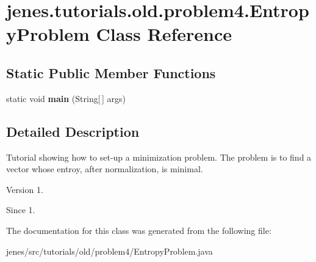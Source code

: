 \hypertarget{classjenes_1_1tutorials_1_1old_1_1problem4_1_1_entropy_problem}{\section{jenes.\-tutorials.\-old.\-problem4.\-Entropy\-Problem Class Reference}
\label{classjenes_1_1tutorials_1_1old_1_1problem4_1_1_entropy_problem}
}
\subsection*{Static Public Member Functions}
\begin{DoxyCompactItemize}
\item 
\hypertarget{classjenes_1_1tutorials_1_1old_1_1problem4_1_1_entropy_problem_a0d51bbf6082f703157baaa168dd5f217}{static void {\bfseries main} (String\mbox{[}$\,$\mbox{]} args)}\label{classjenes_1_1tutorials_1_1old_1_1problem4_1_1_entropy_problem_a0d51bbf6082f703157baaa168dd5f217}

\end{DoxyCompactItemize}


\subsection{Detailed Description}
Tutorial showing how to set-\/up a minimization problem. The problem is to find a vector whose entroy, after normalization, is minimal.

\begin{DoxyVersion}{Version}
1. 
\end{DoxyVersion}
\begin{DoxySince}{Since}
1. 
\end{DoxySince}


The documentation for this class was generated from the following file\-:\begin{DoxyCompactItemize}
\item 
jenes/src/tutorials/old/problem4/Entropy\-Problem.\-java\end{DoxyCompactItemize}
